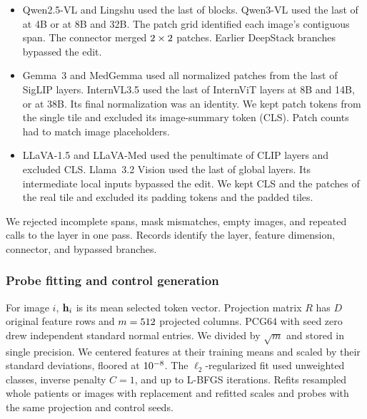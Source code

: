 \begin{itemize}[leftmargin=*,itemsep=1pt,topsep=2pt]
\item Qwen2.5-VL and Lingshu used the last of \jnQwenVisionDepth{} blocks. Qwen3-VL used the last of \jnQwenThreeShallowDepth{} at 4B or \jnQwenThreeDeepDepth{} at 8B and 32B. The patch grid identified each image's contiguous span. The connector merged $2\times2$ patches. Earlier DeepStack branches bypassed the edit.
\item Gemma~3 and MedGemma used all normalized patches from the last of \jnSiglipDepth{} SigLIP layers. InternVL3.5 used the last of \jnInternVlShallowDepth{} InternViT layers at 8B and 14B, or \jnInternVlDeepDepth{} at 38B. Its final normalization was an identity. We kept patch tokens from the single tile and excluded its image-summary token (CLS). Patch counts had to match image placeholders.
\item LLaVA-1.5 and LLaVA-Med used the penultimate of \jnClipDepth{} CLIP layers and excluded CLS. Llama~3.2 Vision used the last of \jnLlamaGlobalDepth{} global layers. Its \jnLlamaLocalBranches{} intermediate local inputs bypassed the edit. We kept CLS and the patches of the real tile and excluded its \jnLlamaPaddingTokens{} padding tokens and the \jnLlamaPaddingTiles{} padded tiles.
\end{itemize}

We rejected incomplete spans, mask mismatches, empty images, and repeated calls to the layer in one pass. Records identify the layer, feature dimension, connector, and bypassed branches.

\subsubsection{Probe fitting and control generation}
\label{app:repro-probe}
\label{app:repro-controls}

For image $i$, $\mathbf{h}_i$ is its mean selected token vector. Projection matrix $R$ has $D$ original feature rows and $m=512$ projected columns. PCG64 with seed zero drew independent standard normal entries. We divided by $\sqrt{m}$ and stored in single precision. We centered features at their training means and scaled by their standard deviations, floored at $10^{-8}$. The $\ell_2$-regularized fit used unweighted classes, inverse penalty $C=1$, and up to \jnProbeMaxIterations{} L-BFGS iterations. Refits resampled whole patients or images with replacement and refitted scales and probes with the same projection and control seeds.

